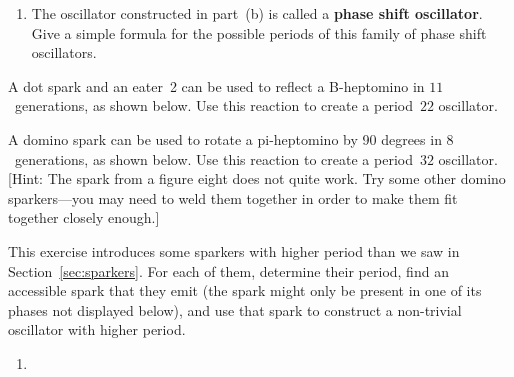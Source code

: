 \begin{multicols}{2}
\begin{problemstar}
\begin{enumerate}[label=\bf\color{ocre}(\alph*)]
			\item {} The oscillator constructed in part~(b) is called a \textbf{phase shift oscillator}. Give a simple formula for the possible periods of this family of phase shift oscillators.
		\end{enumerate}
	\end{problemstar}


	\mfilbreak
	
	
	\begin{problem}\label{exer:b_heptomino_hassle} 
		A dot spark and an eater~2 can be used to reflect a B-heptomino in $11$~generations, as shown below. Use this reaction to create a period~$22$ oscillator.
		\begin{center}
		\end{center}
	\end{problem}
	
	
	\mfilbreak
	
	
	\begin{problemstar}\label{exer:pi_hassle} 
		A domino spark can be used to rotate a pi-heptomino by 90 degrees in $8$~generations, as shown below. Use this reaction to create a period~$32$ oscillator. [Hint: The spark from a figure eight does not quite work. Try some other domino sparkers---you may need to weld them together in order to make them fit together closely enough.]
		\begin{center}
		\end{center}
	\end{problemstar}
	
	
	\mfilbreak
	
	
	\begin{problemstar}\label{exer:high_period_sparkers} 
		This exercise introduces some sparkers with higher period than we saw in Section~\ref{sec:sparkers}. For each of them, determine their period, find an accessible spark that they emit (the spark might only be present in one of its phases not displayed below), and use that spark to construct a non-trivial oscillator with higher period.
		\begin{multicols}{2}
			\begin{enumerate}
				\item[\bf\color{ocre}(a)] 
				

\end{enumerate}
\end{multicols}
\end{problemstar}
\end{multicols}
